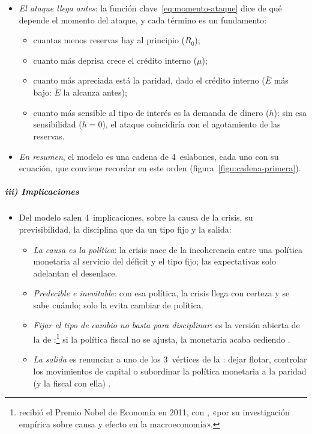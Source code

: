 \documentclass[11pt]{article}
\begin{document}
\begin{itemize}
\item \emph{El ataque llega antes}: la función clave~\eqref{eq:momento-ataque} dice de qué depende el momento del ataque, y cada término es un fundamento:
  \begin{itemize}
  \item cuantas menos reservas hay al principio ($R_0$);
  \item cuanto más deprisa crece el crédito interno ($\mu$);
  \item cuanto más apreciada está la paridad, dado el crédito interno ($\bar E$ más bajo: $\tilde E$ la alcanza antes);
  \item cuanto más sensible al tipo de interés es la demanda de dinero ($h$): sin esa sensibilidad ($h=0$), el ataque coincidiría con el agotamiento de las reservas.
  \end{itemize}
\item \emph{En resumen}, el modelo es una cadena de 4~eslabones, cada uno con su ecuación, que conviene recordar en este orden (figura~\ref{figu:cadena-primera}).
\end{itemize}

\begin{infografia}[H]
\centering
\caption{La cadena de la primera generación, de la política al ataque}\label{figu:cadena-primera}
\end{infografia}

\subparagraph{iii) Implicaciones}

\begin{itemize}
\item Del modelo salen 4~implicaciones, sobre la causa de la crisis, su previsibilidad, la disciplina que da un tipo fijo y la salida:
  \begin{itemize}
  \item \emph{La causa es la política}: la crisis nace de la incoherencia entre una política monetaria al servicio del déficit y el tipo fijo; las expectativas solo adelantan el desenlace.
  \item \emph{Predecible e inevitable}: con esa política, la crisis llega con certeza y se sabe cuándo; solo la evita cambiar de política.
  \item \emph{Fijar el tipo de cambio no basta para disciplinar}: es la versión abierta de la  de \textcite{SargentWallace1981Some}:\footnote{ recibió el Premio Nobel de Economía en 2011, con , «por su investigación empírica sobre causa y efecto en la macroeconomía»\nocite{Nobel2011SargentSims}.} si la política fiscal no se ajusta, la monetaria acaba cediendo .
  \item \emph{La salida} es renunciar a uno de los 3~vértices de la : dejar flotar, controlar los movimientos de capital o subordinar la política monetaria a la paridad (y la fiscal con ella)\nocite{ObstfeldShambaughTaylor2005}  .
  \end{itemize}
\end{itemize}
\end{document}
